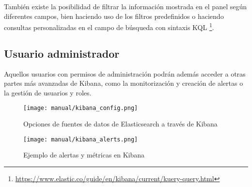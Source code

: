 También existe la posibilidad de filtrar la información mostrada en el panel
según diferentes campos, bien haciendo uso de los filtros predefinidos o
haciendo consultas personalizadas en el campo de búsqueda con sintaxis KQL
\footnote{\url{https://www.elastic.co/guide/en/kibana/current/kuery-query.html}}.


\subsection{Usuario administrador}
Aquellos usuarios con permisos de administración podrán además acceder a otras
partes más avanzadas de Kibana, como la monitorización y creación de alertas o
la gestión de usuarios y roles.

\begin{figure}[H]
	\centering
  	\texttt{[image: manual/kibana\_config.png]}
  	\caption{Opciones de fuentes de datos de Elasticsearch a través de Kibana}
  \label{fig:kibana_config}
\end{figure}

\begin{figure}[H]
	\centering
  	\texttt{[image: manual/kibana\_alerts.png]}
  	\caption{Ejemplo de alertas y métricas en Kibana}
  	\label{fig:kibana_alerts}
\end{figure}
